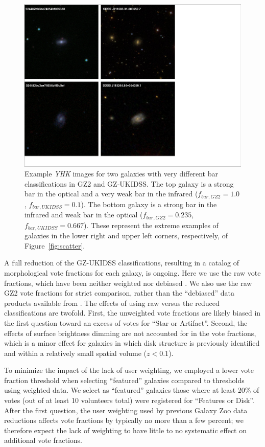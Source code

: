 \documentclass[useAMS,usenatbib]{mn2e}
\begin{document}
\begin{figure}
\includegraphics[scale=0.6]{figures/bars_different_gz2_ukidss.pdf}
\caption{
    Example \emph{YHK} images for two galaxies with very different bar classifications in GZ2 and GZ-UKIDSS. The top galaxy is a strong bar in the optical and a very weak bar in the infrared ($f_{bar,GZ2}=1.0$, $f_{bar,UKIDSS} = 0.1$). The bottom galaxy is a strong bar in the infrared and weak bar in the optical ($f_{bar,GZ2}=0.235$, $f_{bar,UKIDSS} = 0.667$). These represent the extreme examples of galaxies in the lower right and upper left corners, respectively, of Figure~\ref{fig:scatter}. 
}
\label{fig:different}
\end{figure}
%
A full reduction of the GZ-UKIDSS classifications, resulting in a catalog of morphological vote fractions for each galaxy, is ongoing. Here we use the raw vote fractions, which have been neither weighted nor debiased \citep[by a procedure similar to][]{wil13}. We also use the raw GZ2 vote fractions for strict comparison, rather than the ``debiased'' data products available from \citet{wil13}. The effects of using raw versus the reduced classifications are twofold. First, the unweighted vote fractions are likely biased in the first question toward an excess of votes for ``Star or Artifact''. Second, the effects of surface brightness dimming are not accounted for in the vote fractions, which is a minor effect for galaxies in which disk structure is previously identified and within a relatively small spatial volume ($z<0.1$). 

To minimize the impact of the lack of user weighting, we employed a lower vote fraction threshold when selecting ``featured'' galaxies compared to thresholds using weighted data. We select as ``featured'' galaxies those where at least 20\% of votes (out of at least 10 volunteers total) were registered for ``Features or Disk''. After the first question, the user weighting used by previous Galaxy Zoo data reductions affects vote fractions by typically no more than a few percent; we therefore expect the lack of weighting to have little to no systematic effect on additional vote fractions. 
\end{document}
